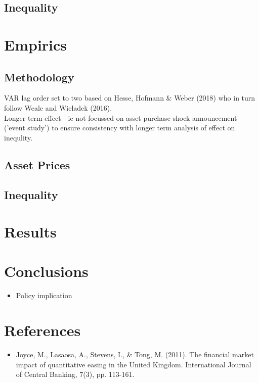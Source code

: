 \documentclass{article}
\begin{document}
\subsection{Inequality}


\section{Empirics}
\subsection{Methodology}
VAR lag order set to two based on Hesse, Hofmann \& Weber (2018) who in turn follow Weale and Wieladek (2016). \\
Longer term effect - ie not focussed on asset purchase shock announcement ('event study') to ensure consistency with longer term analysis of effect on inequlity.
\subsection{Asset Prices}
\subsection{Inequality}

\section{Results}
\section{Conclusions}
\begin{itemize}
  \item Policy implication
\end{itemize}
\section{References}
\begin{itemize}
  \item Joyce, M., Lasaosa, A., Stevens, I., \& Tong, M. (2011). The financial market impact of quantitative easing in the United Kingdom. International Journal of Central Banking, 7(3), pp. 113-161.
\end{itemize}
\end{document}
